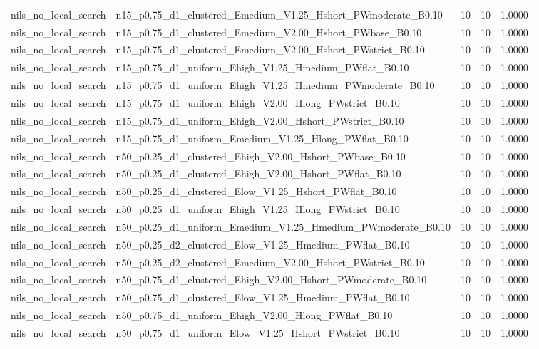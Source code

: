 \begin{tabular}{llrrr}
nils_no_local_search & n15_p0.75_d1_clustered_Emedium_V1.25_Hshort_PWmoderate_B0.10 & 10 & 10 & 1.0000 \\
nils_no_local_search & n15_p0.75_d1_clustered_Emedium_V2.00_Hshort_PWbase_B0.10 & 10 & 10 & 1.0000 \\
nils_no_local_search & n15_p0.75_d1_clustered_Emedium_V2.00_Hshort_PWstrict_B0.10 & 10 & 10 & 1.0000 \\
nils_no_local_search & n15_p0.75_d1_uniform_Ehigh_V1.25_Hmedium_PWflat_B0.10 & 10 & 10 & 1.0000 \\
nils_no_local_search & n15_p0.75_d1_uniform_Ehigh_V1.25_Hmedium_PWmoderate_B0.10 & 10 & 10 & 1.0000 \\
nils_no_local_search & n15_p0.75_d1_uniform_Ehigh_V2.00_Hlong_PWstrict_B0.10 & 10 & 10 & 1.0000 \\
nils_no_local_search & n15_p0.75_d1_uniform_Ehigh_V2.00_Hshort_PWstrict_B0.10 & 10 & 10 & 1.0000 \\
nils_no_local_search & n15_p0.75_d1_uniform_Emedium_V1.25_Hlong_PWflat_B0.10 & 10 & 10 & 1.0000 \\
nils_no_local_search & n50_p0.25_d1_clustered_Ehigh_V2.00_Hshort_PWbase_B0.10 & 10 & 10 & 1.0000 \\
nils_no_local_search & n50_p0.25_d1_clustered_Ehigh_V2.00_Hshort_PWflat_B0.10 & 10 & 10 & 1.0000 \\
nils_no_local_search & n50_p0.25_d1_clustered_Elow_V1.25_Hshort_PWflat_B0.10 & 10 & 10 & 1.0000 \\
nils_no_local_search & n50_p0.25_d1_uniform_Ehigh_V1.25_Hlong_PWstrict_B0.10 & 10 & 10 & 1.0000 \\
nils_no_local_search & n50_p0.25_d1_uniform_Emedium_V1.25_Hmedium_PWmoderate_B0.10 & 10 & 10 & 1.0000 \\
nils_no_local_search & n50_p0.25_d2_clustered_Elow_V1.25_Hmedium_PWflat_B0.10 & 10 & 10 & 1.0000 \\
nils_no_local_search & n50_p0.25_d2_clustered_Emedium_V2.00_Hshort_PWstrict_B0.10 & 10 & 10 & 1.0000 \\
nils_no_local_search & n50_p0.75_d1_clustered_Ehigh_V2.00_Hshort_PWmoderate_B0.10 & 10 & 10 & 1.0000 \\
nils_no_local_search & n50_p0.75_d1_clustered_Elow_V1.25_Hmedium_PWflat_B0.10 & 10 & 10 & 1.0000 \\
nils_no_local_search & n50_p0.75_d1_uniform_Ehigh_V2.00_Hlong_PWflat_B0.10 & 10 & 10 & 1.0000 \\
nils_no_local_search & n50_p0.75_d1_uniform_Elow_V1.25_Hshort_PWstrict_B0.10 & 10 & 10 & 1.0000 \\

\end{tabular}
